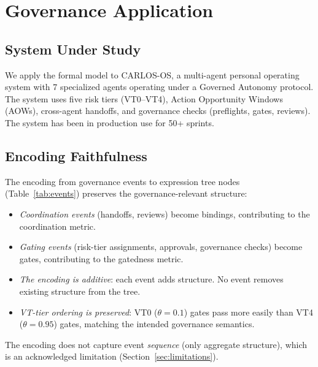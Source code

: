 \documentclass[sigconf,nonacm]{acmart}
\begin{document}
\section{Governance Application}\label{sec:application}

\subsection{System Under Study}

We apply the formal model to CARLOS-OS, a multi-agent personal operating
system with 7 specialized agents operating under a Governed Autonomy
protocol. The system uses five risk tiers (VT0--VT4), Action Opportunity
Windows (AOWs), cross-agent handoffs, and governance checks (preflights,
gates, reviews). The system has been in production use for 50+ sprints.

\subsection{Encoding Faithfulness}

The encoding from governance events to expression tree nodes
(Table~\ref{tab:events}) preserves the governance-relevant structure:

\begin{itemize}[leftmargin=*]
  \item \emph{Coordination events} (handoffs, reviews) become bindings,
    contributing to the coordination metric.
  \item \emph{Gating events} (risk-tier assignments, approvals, governance
    checks) become gates, contributing to the gatedness metric.
  \item \emph{The encoding is additive}: each event adds structure. No event
    removes existing structure from the tree.
  \item \emph{VT-tier ordering is preserved}: VT0 ($\theta = 0.1$) gates
    pass more easily than VT4 ($\theta = 0.95$) gates, matching the
    intended governance semantics.
\end{itemize}

The encoding does not capture event \emph{sequence} (only aggregate
structure), which is an acknowledged limitation (Section~\ref{sec:limitations}).
\end{document}
